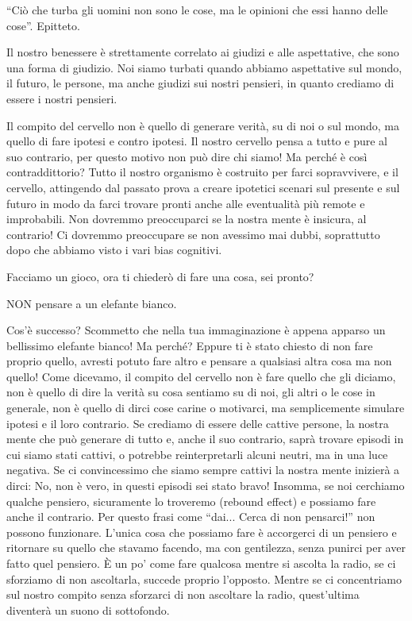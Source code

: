 \documentclass[12pt]{book} %
\begin{document}
“Ciò che turba gli uomini non sono le cose, ma le opinioni che essi hanno delle cose”. Epitteto.

Il nostro benessere è strettamente correlato ai giudizi e alle aspettative, che sono una forma di giudizio. Noi siamo
turbati quando abbiamo aspettative sul mondo, il futuro, le persone, ma anche giudizi sui nostri pensieri, in quanto
crediamo di essere i nostri pensieri.

Il compito del cervello non è quello di generare verità, su di noi o sul mondo, ma quello di fare ipotesi e contro
ipotesi. Il nostro cervello pensa a tutto e pure al suo contrario, per questo motivo non può dire chi siamo! Ma perché
è così contraddittorio? Tutto il nostro organismo è costruito per farci sopravvivere, e il cervello, attingendo dal
passato prova a creare ipotetici scenari sul presente e sul futuro in modo da farci trovare pronti anche alle
eventualità più remote e improbabili. Non dovremmo preoccuparci se la nostra mente è insicura, al contrario! Ci
dovremmo preoccupare se non avessimo mai dubbi, soprattutto dopo che abbiamo visto i vari bias cognitivi. 

Facciamo un gioco, ora ti chiederò di fare una cosa, sei pronto?

NON pensare a un elefante bianco. 

Cos'è successo? Scommetto che nella tua immaginazione è appena apparso un bellissimo elefante
bianco! Ma perché? Eppure ti è stato chiesto di non fare proprio quello, avresti potuto fare altro e pensare a
qualsiasi altra cosa ma non quello! Come dicevamo, il compito del cervello non è fare quello che gli diciamo, non è
quello di dire la verità su cosa sentiamo su di noi, gli altri o le cose in generale, non è quello di dirci cose carine
o motivarci, ma semplicemente simulare ipotesi e il loro contrario. Se crediamo di essere delle cattive persone, la
nostra mente che può generare di tutto e, anche il suo contrario, saprà trovare episodi in cui siamo stati cattivi, o
potrebbe reinterpretarli alcuni neutri, ma in una luce negativa. Se ci convincessimo che siamo sempre cattivi la nostra
mente inizierà a dirci: No, non è vero, in questi episodi sei stato bravo! Insomma, se noi cerchiamo qualche pensiero,
sicuramente lo troveremo (rebound effect) e possiamo fare anche il contrario. Per questo frasi come “dai... Cerca di
non pensarci!” non possono funzionare. L'unica cosa che possiamo fare è accorgerci di un pensiero
e ritornare su quello che stavamo facendo, ma con gentilezza, senza punirci per aver fatto quel pensiero. È un
po' come fare qualcosa mentre si ascolta la radio, se ci sforziamo di non ascoltarla, succede
proprio l'opposto. Mentre se ci concentriamo sul nostro compito senza sforzarci di non ascoltare
la radio, quest'ultima diventerà un suono di sottofondo.
\end{document}
